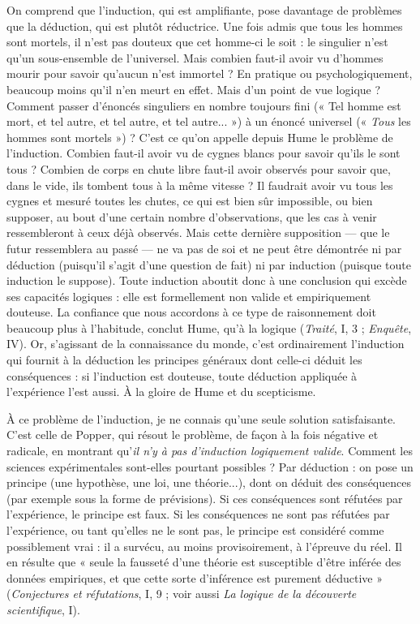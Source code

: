 On comprend que l’induction, qui est amplifiante, pose davantage de problèmes
que la déduction, qui est plutôt réductrice. Une fois admis que tous les
hommes sont mortels, il n’est pas douteux que cet homme-ci le soit : le singulier
n’est qu’un sous-ensemble de l’universel. Mais combien faut-il avoir vu
d'hommes mourir pour savoir qu’aucun n’est immortel ? En pratique ou psychologiquement,
beaucoup moins qu’il n’en meurt en effet. Mais d’un point de
vue logique ? Comment passer d’énoncés singuliers en nombre toujours fini
(« Tel homme est mort, et tel autre, et tel autre, et tel autre... ») à un énoncé
universel (« {\it Tous} les hommes sont mortels ») ? C’est ce qu’on appelle depuis
Hume le problème de l’induction. Combien faut-il avoir vu de cygnes blancs
pour savoir qu'ils le sont tous ? Combien de corps en chute libre faut-il avoir
observés pour savoir que, dans le vide, ils tombent tous à la même vitesse ? Il
faudrait avoir vu tous les cygnes et mesuré toutes les chutes, ce qui est bien sûr
impossible, ou bien supposer, au bout d’une certain nombre d’observations,
que les cas à venir ressembleront à ceux déjà observés. Mais cette dernière supposition
— que le futur ressemblera au passé — ne va pas de soi et ne peut être
démontrée ni par déduction (puisqu'il s’agit d’une question de fait) ni par
induction (puisque toute induction le suppose). Toute induction aboutit donc
à une conclusion qui excède ses capacités logiques : elle est formellement non
valide et empiriquement douteuse. La confiance que nous accordons à ce type
de raisonnement doit beaucoup plus à l’habitude, conclut Hume, qu’à la
logique ({\it Traité}, I, 3 ; {\it Enquête}, IV). Or, s'agissant de la connaissance du monde,
c’est ordinairement l'induction qui fournit à la déduction les principes généraux
dont celle-ci déduit les conséquences : si l'induction est douteuse, toute
déduction appliquée à l’expérience l’est aussi. À la gloire de Hume et du scepticisme.

À ce problème de l'induction, je ne connais qu’une seule solution satisfaisante.
C’est celle de Popper, qui résout le problème, de façon à la fois négative
et radicale, en montrant qu’{\it il n'y à pas d'induction logiquement valide}. Comment
les sciences expérimentales sont-elles pourtant possibles ? Par déduction :
on pose un principe (une hypothèse, une loi, une théorie...), dont on déduit
des conséquences (par exemple sous la forme de prévisions). Si ces conséquences
sont réfutées par l’expérience, le principe est faux. Si les conséquences
ne sont pas réfutées par l'expérience, ou tant qu’elles ne le sont pas, le principe
est considéré comme possiblement vrai : il a survécu, au moins provisoirement,
à l'épreuve du réel. Il en résulte que « seule la fausseté d’une théorie est susceptible
d’être inférée des données empiriques, et que cette sorte d’inférence est
purement déductive » ({\it Conjectures et réfutations}, I, 9 ; voir aussi {\it La logique de la
découverte scientifique}, I).

